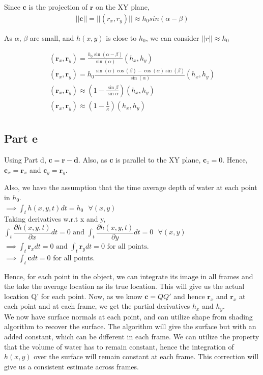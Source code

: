 \documentclass[11pt]{article}
\begin{document}
Since $\mathbf{c}$ is the projection of $\mathbf{r}$ on the XY plane,
\begin{gather*}
||\mathbf{c}|| = ||(r_{x},r_{y})|| \approx h_{0} sin(\alpha-\beta)
\end{gather*}


As $\alpha$, $\beta$ are small, and $h(x,y)$ is close to $h_{0}$, we can consider $||r|| \approx h_{0}$

\begin{gather*}
(\mathbf{r}_{x},\mathbf{r}_{y}) = \frac{h_{0} \sin(\alpha-\beta)}{\sin(\alpha)} (h_{x},h_{y})\\
(\mathbf{r}_{x},\mathbf{r}_{y}) = h_{0} \frac{\sin(\alpha)\cos(\beta) - \cos(\alpha)\sin(\beta)}{\sin(\alpha)} (h_{x},h_{y})\\
(\mathbf{r}_{x},\mathbf{r}_{y}) \approx (1-\frac{\sin\beta}{\sin\alpha}) (h_{x},h_{y})\\
(\mathbf{r}_{x},\mathbf{r}_{y}) \approx (1-\frac{1}{\kappa}) (h_{x},h_{y})\\
\end{gather*}

\subsection*{Part e}
Using Part d, $\mathbf{c} = \mathbf{r} - \mathbf{d}$. Also, as $\mathbf{c}$ is parallel to the XY plane, $\mathbf{c}_{z} = 0$. Hence, $\mathbf{c}_{x} = \mathbf{r}_{x}$ and $\mathbf{c}_{y} = \mathbf{r}_{y}$.

Also, we have the assumption that the time average depth of water at each point in $h_{0}$.\\

$
\implies \int_{t} h(x,y,t) dt = h_{0}   \text{ } \forall (x,y)
$\\
Taking derivatives w.r.t x and y,\\
$
\int_{t} \dfrac{\partial{h(x,y,t)}}{\partial{x}} dt = 0 \text{  and  } \int_{t} \dfrac{\partial{h(x,y,t)}}{\partial{y}} dt = 0   \text{ } \forall (x,y) 
$\\
$
\implies \int_{t} \mathbf{r}_{x} dt = 0 \text{ and } \int_{t} \mathbf{r}_{y} dt = 0 \text{ for all points. }
$\\
$\implies \int_{t} \mathbf{c} dt = 0 $ for all points.

Hence, for each point in the object, we can integrate its image in all frames and the take the average location as its true location. This will give us the actual location Q' for each point. Now, as we know $\mathbf{c} = QQ'$ and hence $\mathbf{r}_{x}$ and $\mathbf{r}_{x}$ at each point and at each frame, we get the partial derivatives $h_{x}$ and $h_{y}$.\\

We now have surface normals at each point, and can utilize shape from shading algorithm to recover the surface. The algorithm will give the surface but with an added constant, which can be different in each frame. We can utilize the property that the volume of water has to remain constant, hence the integration of $h(x,y)$ over the surface will remain constant at each frame. This correction will give us a consistent estimate across frames.
\end{document}
